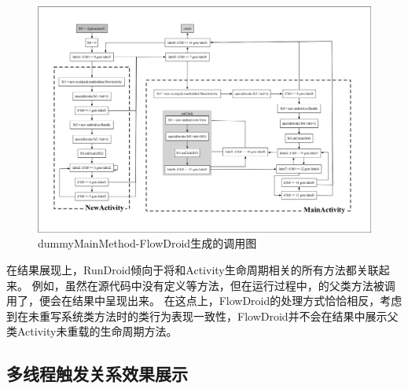 \begin{figure}[ht]
	\centering
	\includegraphics[width=\textwidth]{./Figures/flowdroid-dummyMainMethod.png}
	\caption{dummyMainMethod-FlowDroid生成的调用图}
	\label{fig:flowdroid-result-lifecycle}
\end{figure}

在结果展现上，RunDroid倾向于将和Activity生命周期相关的所有方法都关联起来。
例如，虽然在源代码中没有定义等方法，但在运行过程中，的父类方法被调用了，便会在结果中呈现出来。
在这点上，FlowDroid的处理方式恰恰相反，考虑到在未重写系统类方法时的类行为表现一致性，FlowDroid并不会在结果中展示父类Activity未重载的生命周期方法。



\subsection{多线程触发关系效果展示}



